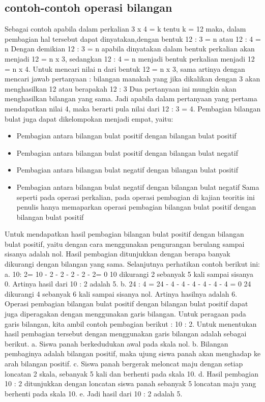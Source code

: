 \subsection{contoh-contoh operasi bilangan}
Sebagai contoh apabila dalam perkalian 3 x 4 = k tentu k = 12 maka, dalam pembagian hal tersebut dapat dinyatakan,dengan bentuk 12 : 3 = n atau 12 : 4 = n
Dengan demikian 12 : 3 = n apabila dinyatakan dalam bentuk perkalian akan menjadi 12 = n x 3, sedangkan 12 : 4 = n menjadi bentuk perkalian menjadi 12 = n x 4. Untuk mencari nilai n dari bentuk 12 = n x 3, sama artinya dengan mencari jawab pertanyaan : bilangan manakah yang jika dikalikan dengan 3 akan menghasilkan 12 atau berapakah 12 : 3  Dua pertanyaan ini mungkin akan menghasilkan bilangan yang sama. Jadi apabila dalam pertanyaan yang pertama mendapatkan nilai 4, maka berarti pula nilai dari 12 : 3 = 4.
Pembagian bilangan bulat juga dapat dikelompokan menjadi empat, yaitu:
\begin{itemize}
\item Pembagian antara bilangan bulat positif dengan bilangan bulat positif 
\item Pembagian antara bilangan bulat positif dengan bilangan bulat negatif 
\item Pembagian antara bilangan bulat negatif dengan bilangan bulat positif 
\item Pembagian antara bilangan bulat negatif dengan bilangan bulat negatif Sama seperti pada operasi perkalian, pada operasi pembagian di kajian teoritis ini penulis hanya memaparkan operasi pembagian bilangan bulat positif dengan bilangan bulat positif
\end{itemize}

Untuk mendapatkan hasil pembagian bilangan bulat positif dengan bilangan bulat positif, yaitu dengan cara menggunakan pengurangan berulang sampai sisanya adalah nol. Hasil pembagian ditunjukkan dengan berapa banyak dikurangi dengan bilangan yang sama. Selanjutnya perhatikan contoh berikut ini: a. 10: 2= 10 - 2 - 2 - 2 - 2 - 2= 0 10 dikurangi 2 sebanyak 5 kali sampai sisanya 0. Artinya hasil dari 10 : 2 adalah 5. b. 24 : 4 = 24 - 4 - 4 - 4 - 4 - 4 - 4 = 0 24 dikurangi 4 sebanyak 6 kali sampai sisanya nol.
 Artinya hasilnya adalah 6. Operasi pembagian bilangan bulat positif dengan bilangan bulat positif dapat juga diperagakan dengan menggunakan garis bilangan. Untuk peragaan pada garis bilangan, kita ambil contoh pembagian berikut : 10 : 2. Untuk menentukan hasil pembagian tersebut dengan menggunakan garis bilangan adalah sebagai berikut. a. Siswa panah berkedudukan awal pada skala nol. b. Bilangan pembaginya adalah bilangan positif, maka ujung siswa panah akan menghadap ke arah bilangan positif. c. Siswa panah bergerak meloncat maju dengan setiap loncatan 2 skala, sebanyak 5 kali dan berhenti pada skala 10. d. Hasil pembagian 10 : 2 ditunjukkan dengan loncatan siswa panah sebanyak 5 loncatan maju yang berhenti pada skala 10. e. Jadi hasil dari 10 : 2 adalah 5.

